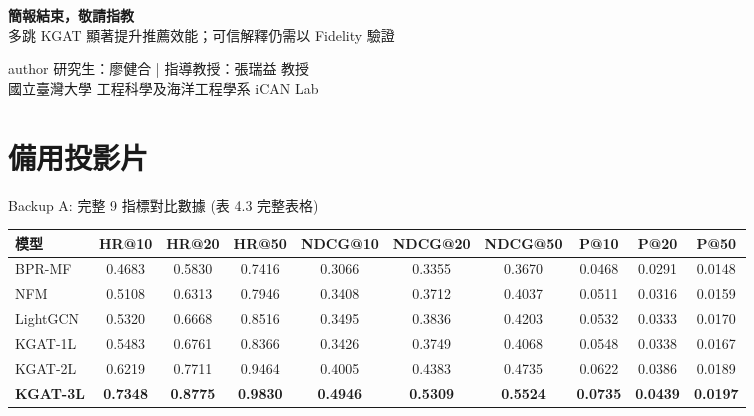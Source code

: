 \documentclass[aspectratio=169, 10pt]{beamer}
\begin{document}
{
\begin{frame}[plain]
  \vfill
  \begin{center}
    {\color{white}\Huge \textbf{簡報結束，敬請指教}}\\[0.6cm]
    {\color{NTUBlueLight}\Large 多跳 KGAT 顯著提升推薦效能；可信解釋仍需以 Fidelity 驗證}\\[1.0cm]
    
    \begin{beamercolorbox}[sep=6pt,center,rounded=true]{author}
      {\color{white}\small 研究生：廖健合 \quad | \quad 指導教授：張瑞益 教授}\\[0.1cm]
      {\color{white}\small 國立臺灣大學 工程科學及海洋工程學系 iCAN Lab}
    \end{beamercolorbox}
  \end{center}
  \vfill
\end{frame}
}

\appendix
\section*{備用投影片}

\begin{frame}{Backup A: 完整 9 指標對比數據 (表 4.3 完整表格)}
  \small
  \begin{table}
    \centering
    \begin{tabular}{l c c c c c c c c c}
      \toprule
      \textbf{模型} & \textbf{HR@10} & \textbf{HR@20} & \textbf{HR@50} & \textbf{NDCG@10} & \textbf{NDCG@20} & \textbf{NDCG@50} & \textbf{P@10} & \textbf{P@20} & \textbf{P@50} \\
      \midrule
      BPR-MF & 0.4683 & 0.5830 & 0.7416 & 0.3066 & 0.3355 & 0.3670 & 0.0468 & 0.0291 & 0.0148 \\
      NFM & 0.5108 & 0.6313 & 0.7946 & 0.3408 & 0.3712 & 0.4037 & 0.0511 & 0.0316 & 0.0159 \\
      LightGCN & 0.5320 & 0.6668 & 0.8516 & 0.3495 & 0.3836 & 0.4203 & 0.0532 & 0.0333 & 0.0170 \\
      \midrule
      KGAT-1L & 0.5483 & 0.6761 & 0.8366 & 0.3426 & 0.3749 & 0.4068 & 0.0548 & 0.0338 & 0.0167 \\
      KGAT-2L & 0.6219 & 0.7711 & 0.9464 & 0.4005 & 0.4383 & 0.4735 & 0.0622 & 0.0386 & 0.0189 \\
      \textbf{KGAT-3L} & \textbf{0.7348} & \textbf{0.8775} & \textbf{0.9830} & \textbf{0.4946} & \textbf{0.5309} & \textbf{0.5524} & \textbf{0.0735} & \textbf{0.0439} & \textbf{0.0197} \\
      \bottomrule
    \end{tabular}
  \end{table}
\end{frame}
\end{document}
